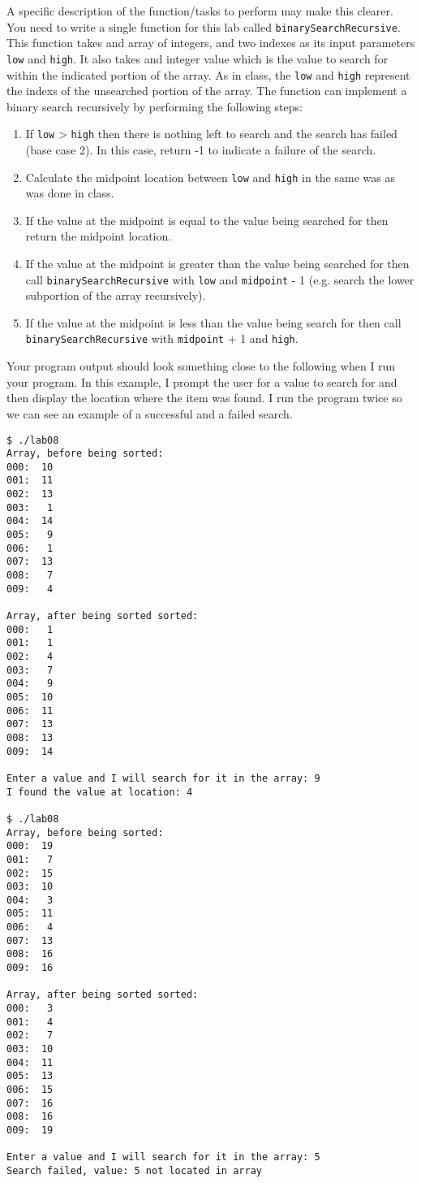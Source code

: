 \documentclass[11pt]{article}
\begin{document}
A specific description of the function/tasks to perform may make this
clearer.  You need to write a single function for this lab called
\verb~binarySearchRecursive~.  This function takes and array of integers,
and two indexes as its input parameters \verb~low~ and \verb~high~.  It also
takes and integer value which is the value to search for within the
indicated portion of the array.  As in class, the \verb~low~ and \verb~high~
represent the indexs of the unsearched portion of the array.  The
function can implement a binary search recursively by performing the
following steps:

\begin{enumerate}
\item If \verb~low~ > \verb~high~ then there is nothing left to search and the
   search has failed (base case 2).  In this case, return -1 to
   indicate a failure of the search.
\item Calculate the midpoint location between \verb~low~ and \verb~high~ in the
   same was as was done in class.
\item If the value at the midpoint is equal to the value being searched for
   then return the midpoint location.
\item If the value at the midpoint is greater than the value being searched for
   then call \verb~binarySearchRecursive~ with \verb~low~ and \verb~midpoint~ - 1 (e.g. 
   search the lower subportion of the array recursively).
\item If the value at the midpoint is less than the value being search for 
   then call \verb~binarySearchRecursive~ with \verb~midpoint~ + 1 and \verb~high~.
\end{enumerate}

Your program output should look something close to the following when
I run your program.  In this example, I prompt the user for a value to
search for and then display the location where the item was found.  I
run the program twice so we can see an example of a successful and a
failed search.


\begin{verbatim}
$ ./lab08
Array, before being sorted:
000:  10
001:  11
002:  13
003:   1
004:  14
005:   9
006:   1
007:  13
008:   7
009:   4

Array, after being sorted sorted:
000:   1
001:   1
002:   4
003:   7
004:   9
005:  10
006:  11
007:  13
008:  13
009:  14

Enter a value and I will search for it in the array: 9
I found the value at location: 4

$ ./lab08
Array, before being sorted:
000:  19
001:   7
002:  15
003:  10
004:   3
005:  11
006:   4
007:  13
008:  16
009:  16

Array, after being sorted sorted:
000:   3
001:   4
002:   7
003:  10
004:  11
005:  13
006:  15
007:  16
008:  16
009:  19

Enter a value and I will search for it in the array: 5
Search failed, value: 5 not located in array
\end{verbatim}
\end{document}
